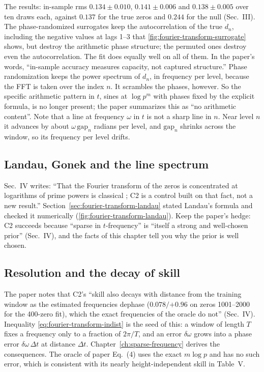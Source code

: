 The results: in-sample rms $0.134\pm0.010$, $0.141\pm0.006$ and $0.138\pm0.005$ over ten draws each, against $0.137$ for the true zeros and $0.244$ for the null (Sec.~III). The phase-randomized surrogates keep the autocorrelation of the true $d_n$, including the negative values at lags 1--3 that \cref{fig:fourier-transform-surrogate} shows, but destroy the arithmetic phase structure; the permuted ones destroy even the autocorrelation. The fit does equally well on all of them. In the paper's words, ``in-sample accuracy measures capacity, not captured structure.'' Phase randomization keeps the power spectrum of $d_n$, in frequency per level, because the FFT is taken over the index $n$. It scrambles the phases, however. So the specific arithmetic pattern in $t$, sines at $\log p^m$ with phases fixed by the explicit formula, is no longer present; the paper summarizes this as ``no arithmetic content''. Note that a line at frequency $\omega$ in $t$ is not a sharp line in $n$. Near level $n$ it advances by about $\omega\,\mathrm{gap}_n$ radians per level, and $\mathrm{gap}_n$ shrinks across the window, so its frequency per level drifts.

\subsection{Landau, Gonek and the line spectrum}

Sec.~IV writes: ``That the Fourier transform of the zeros is concentrated at logarithms of prime powers is classical \cite{landau,gonek}; C2 is a control built on that fact, not a new result.'' Section~\ref{sec:fourier-transform-landau} stated Landau's formula and checked it numerically (\cref{fig:fourier-transform-landau}). Keep the paper's hedge: C2 succeeds because ``sparse in $t$-frequency'' is ``itself a strong and well-chosen prior'' (Sec.~IV), and the facts of this chapter tell you why the prior is well chosen.

\subsection{Resolution and the decay of skill}

The paper notes that C2's ``skill also decays with distance from the training window as the estimated frequencies dephase ($0.078/{+0.96}$ on zeros 1001--2000 for the 400-zero fit), which the exact frequencies of the oracle do not'' (Sec.~IV). Inequality \eqref{eq:fourier-transform-indist} is the seed of this: a window of length $T$ fixes a frequency only to a fraction of $2\pi/T$, and an error $\delta\omega$ grows into a phase error $\delta\omega\,\Delta t$ at distance $\Delta t$. Chapter~\ref{ch:sparse-frequency} derives the consequences. The oracle of paper Eq.~(4) uses the exact $m\log p$ and has no such error, which is consistent with its nearly height-independent skill in Table~V.


